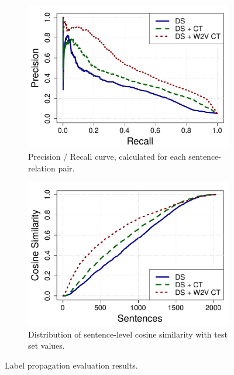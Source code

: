 \begin{figure}[tbh!]
\centering
\begin{subfigure}{.5\textwidth}
\includegraphics[width=\linewidth]{img/pr.pdf}
\caption{Precision / Recall curve, calculated for each sentence-relation pair.}
\label{fig:pr}
\end{subfigure}%
\begin{subfigure}{.5\textwidth}
\includegraphics[width=\linewidth]{img/cos_sim.pdf}
\caption{Distribution of sentence-level cosine similarity with test set values.}
\label{fig:cos_sim}
\end{subfigure}
\caption{Label propagation evaluation results.}
\end{figure}

